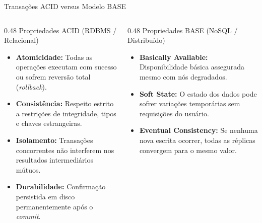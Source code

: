 \begin{frame}{Transações ACID versus Modelo BASE}
  \vspace{0.1cm}
  \begin{columns}[t,onlytextwidth]
    \begin{column}{0.48\textwidth}
      \alert{Propriedades ACID (RDBMS / Relacional)}\par
      \footnotesize
      \begin{itemize}
        \item \textbf{Atomicidade:} Todas as operações executam com sucesso ou sofrem reversão total (\textit{rollback}).
        \item \textbf{Consistência:} Respeito estrito a restrições de integridade, tipos e chaves estrangeiras.
        \item \textbf{Isolamento:} Transações concorrentes não interferem nos resultados intermediários mútuos.
        \item \textbf{Durabilidade:} Confirmação persistida em disco permanentemente após o \textit{commit}.
      \end{itemize}
    \end{column}
    
    \begin{column}{0.48\textwidth}
      \alert{Propriedades BASE (NoSQL / Distribuído)}\par
      \footnotesize
      \begin{itemize}
        \item \textbf{Basically Available:} Disponibilidade básica assegurada mesmo com nós degradados.
        \item \textbf{Soft State:} O estado dos dados pode sofrer variações temporárias sem requisições do usuário.
        \item \textbf{Eventual Consistency:} Se nenhuma nova escrita ocorrer, todas as réplicas convergem para o mesmo valor.
      \end{itemize}
    \end{column}
  \end{columns}
\end{frame}
